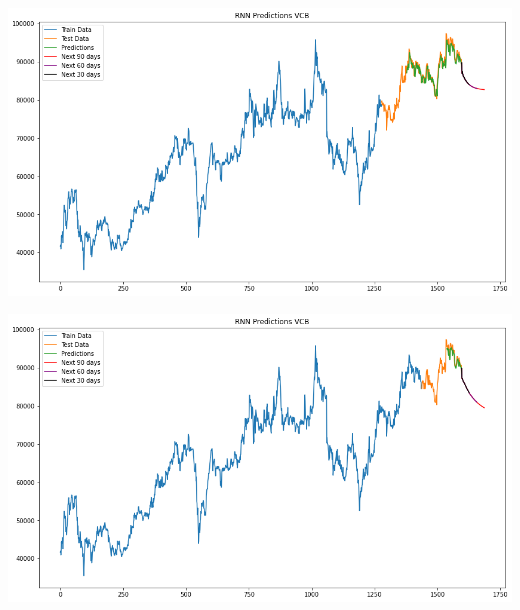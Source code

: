 \documentclass[conference]{IEEEtran}
\begin{document}
\begin{minipage}{0.21\textwidth}
    \centering
    \includegraphics[width=\linewidth]{images/RNN/RNN_VCB_82.png}
    \label{fig:image1}
\end{minipage}
\hfill
\begin{minipage}{0.21\textwidth}
    \centering
    \includegraphics[width=\linewidth]{images/RNN/RNN_VCB_91.png}
    \label{fig:image2}
\end{minipage}
\end{document}
